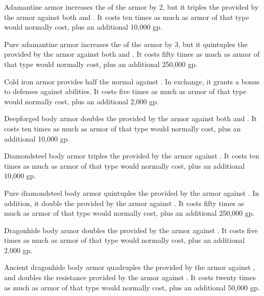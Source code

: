          Adamantine armor increases the  of the armor by 2, but it triples the  provided by the armor against both  and .
        It costs ten times as much as armor of that type would normally cost, plus an additional 10,000 gp.

         Pure adamantine armor increases the  of the armor by 3, but it quintuples the  provided by the armor against both  and .
        It costs fifty times as much as armor of that type would normally cost, plus an additional 250,000 gp.

         Cold iron armor provides half the normal  against .
        In exchange, it grants a  bonus to defenses against  abilities.
        It costs five times as much as armor of that type would normally cost, plus an additional 2,000 gp.

         Deepforged body armor doubles the  provided by the armor against both  and .
        It costs ten times as much as armor of that type would normally cost, plus an additional 10,000 gp.

         Diamondsteel body armor triples the  provided by the armor against .
        It costs ten times as much as armor of that type would normally cost, plus an additional 10,000 gp.

         Pure diamondsteel body armor quintuples the  provided by the armor against .
        In addition, it double the  provided by the armor against .
        It costs fifty times as much as armor of that type would normally cost, plus an additional 250,000 gp.

         Dragonhide body armor doubles the  provided by the armor against .
        It costs five times as much as armor of that type would normally cost, plus an additional 2,000 gp.

         Ancient dragonhide body armor quadruples the  provided by the armor against , and doubles the resistance provided by the armor against .
        It costs twenty times as much as armor of that type would normally cost, plus an additional 50,000 gp.

